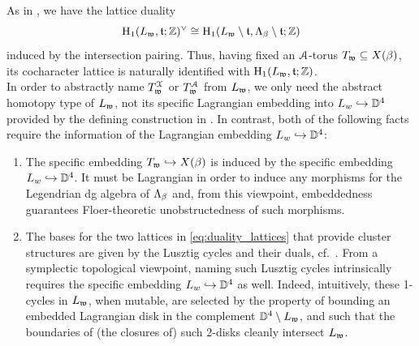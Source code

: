 \noindent As in , we have the lattice duality
\begin{equation}\label{eq:duality_lattices}
\operatorname{H}_1(L_{\mathfrak{w}},\mathfrak{t};\mathbb{Z})^\vee\cong\operatorname{H}_1(L_{\mathfrak{w}}\setminus \mathfrak{t},\Lambda_\beta\setminus \mathfrak{t};\mathbb{Z})
\end{equation}
induced by the intersection pairing. Thus, having fixed an $\mathcal{A}$-torus $T_{\mathfrak{w}}\subseteq X(\beta)$, its cocharacter lattice is naturally identified with $\operatorname{H}_1(L_{\mathfrak{w}},\mathfrak{t};\mathbb{Z})$.\\

In order to abstractly name $T_{\mathfrak{w}}^{\mathcal{X}}$ or $T_{\mathfrak{w}}^{\mathcal{A}}$ from $L_{\mathfrak{w}}$, we only need the abstract homotopy type of $L_{\mathfrak{w}}$, not its specific Lagrangian embedding into $L_w\hookrightarrow\mathbb{D}^4$ provided by the defining construction in . In contrast, both of the following facts require the information of the Lagrangian embedding $L_w\hookrightarrow\mathbb{D}^4$:

\begin{enumerate}
    \item The specific embedding $T_{\mathfrak{w}}\hookrightarrow X(\beta)$ is induced by the specific embedding $L_w\hookrightarrow\mathbb{D}^4$. It must be Lagrangian in order to induce any morphisms for the Legendrian dg algebra of $\Lambda_\beta$ and, from this viewpoint, embeddedness guarantees Floer-theoretic unobstructedness of such morphisms.\\

    \item The bases for the two lattices in \eqref{eq:duality_lattices} that provide cluster structures are given by the Lusztig cycles and their duals, cf.~. From a symplectic topological viewpoint, naming such Lusztig cycles intrinsically requires the specific embedding $L_w\hookrightarrow\mathbb{D}^4$ as well. Indeed, intuitively, these 1-cycles in $L_{\mathfrak{w}}$, when mutable, are selected by the property of bounding an embedded Lagrangian disk in the complement $\mathbb{D}^4\setminus L_{\mathfrak{w}}$, and such that the boundaries of (the closures of) such 2-disks cleanly intersect $L_{\mathfrak{w}}$.
\end{enumerate}


